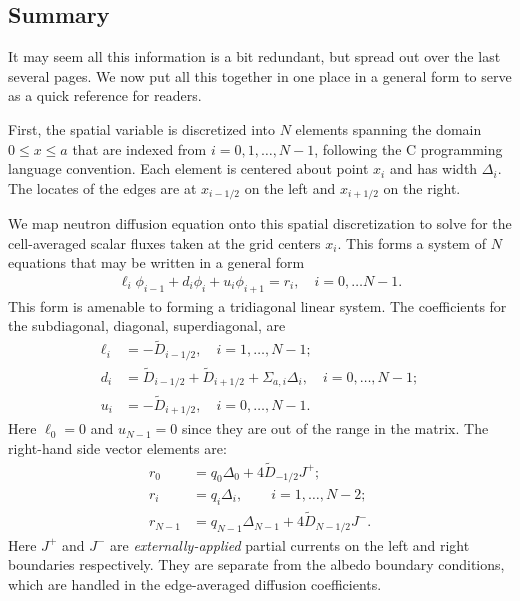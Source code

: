 \subsection{Summary}

It may seem all this information is a bit redundant, but spread out over the last several pages. We now put all this together in one place in a general form to serve as a quick reference for readers. 

First, the spatial variable is discretized into $N$ elements spanning the domain $0 \le x \le a$ that are indexed from $i = 0, 1, \ldots, N-1$, following the C programming language convention. Each element is centered about point $x_i$ and has width $\Delta_i$. The locates of the edges are at $x_{i-1/2}$ on the left and $x_{i+1/2}$ on the right.  

We map neutron diffusion equation onto this spatial discretization to solve for the cell-averaged scalar fluxes taken at the grid centers $x_i$. This forms a system of $N$ equations that may be written in a general form
\begin{align}
  \ell_i \phi_{i-1} + d_i \phi_i + u_i \phi_{i+1} = r_i , \quad i = 0, \ldots N-1.
\end{align}
This form is amenable to forming a tridiagonal linear system. The coefficients for the subdiagonal, diagonal, superdiagonal, are
\begin{subequations}
\begin{align}
  \ell_i	&= -\widetilde{D}_{i-1/2}, \quad i = 1, \ldots, N-1; \\
  d_i		&=  \widetilde{D}_{i-1/2} + \widetilde{D}_{i+1/2}  + \Sigma_{a,i} \Delta_i, \quad i = 0, \ldots, N-1; \\
  u_i		&= -\widetilde{D}_{i+1/2}, \quad i = 0, \ldots, N-1.
\end{align} 
\end{subequations}
Here $\ell_0 = 0$ and $u_{N-1} = 0$ since they are out of the range in the matrix. The right-hand side vector elements are:
\begin{subequations}
\begin{align}
  r_0		&= q_0 \Delta_0 + 4 \widetilde{D}_{-1/2} J^+ ; \\
  r_i		&= q_i \Delta_i , \qquad i = 1, \ldots, N-2; \\
  r_{N-1}	&= q_{N-1} \Delta_{N-1} + 4 \widetilde{D}_{N-1/2} J^-.
\end{align} 
\end{subequations}
Here $J^+$ and $J^-$ are \emph{externally-applied} partial currents on the left and right boundaries respectively. They are separate from the albedo boundary conditions, which are handled in the edge-averaged diffusion coefficients.

